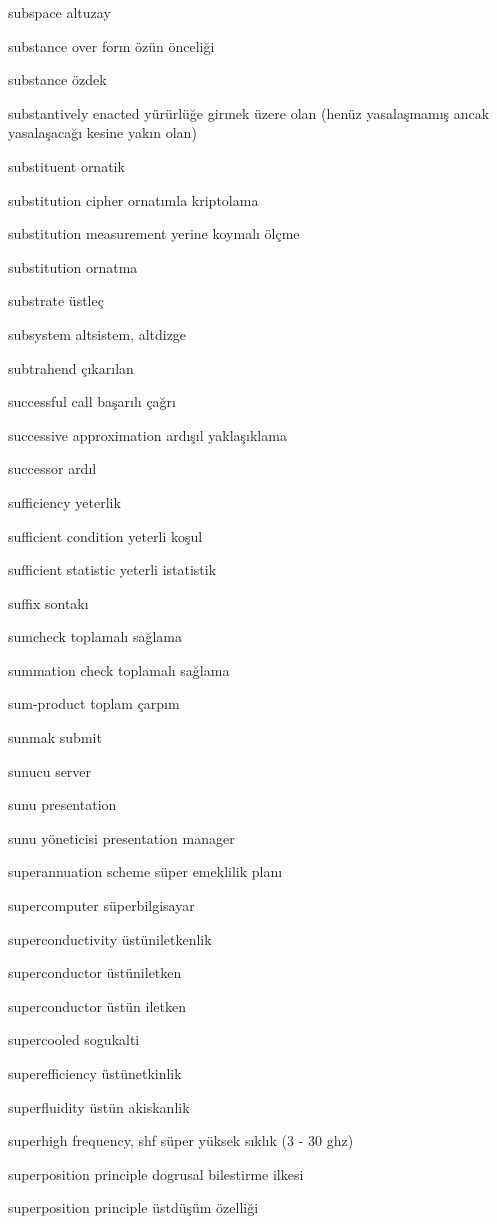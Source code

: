 \documentclass[12pt,fleqn]{article}\usepackage{../../common}
\begin{document}
subspace altuzay

substance over form özün önceliği

substance özdek

substantively enacted yürürlüğe girmek üzere olan (henüz yasalaşmamış ancak yasalaşacağı kesine yakın olan)

substituent ornatik

substitution cipher ornatımla kriptolama

substitution measurement yerine koymalı ölçme

substitution ornatma

substrate üstleç

subsystem altsistem, altdizge

subtrahend çıkarılan

successful call başarılı çağrı

successive approximation ardışıl yaklaşıklama

successor ardıl

sufficiency yeterlik

sufficient condition yeterli koşul

sufficient statistic yeterli istatistik

suffix sontakı

sumcheck toplamalı sağlama

summation check toplamalı sağlama

sum-product toplam çarpım

sunmak submit

sunucu server

sunu presentation

sunu yöneticisi presentation manager

superannuation scheme süper emeklilik planı

supercomputer süperbilgisayar

superconductivity üstüniletkenlik

superconductor üstüniletken

superconductor üstün iletken

supercooled sogukalti

superefficiency üstünetkinlik

superfluidity üstün akiskanlik

superhigh frequency, shf süper yüksek sıklık (3 - 30 ghz)

superposition principle dogrusal bilestirme ilkesi

superposition principle üstdüşüm özelliği
\end{document}
